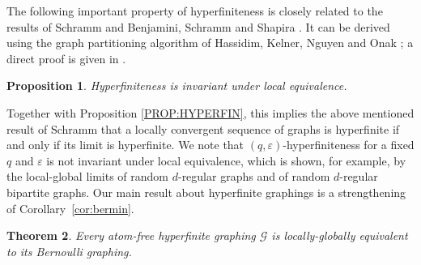 \documentclass{article}
\newtheorem{theorem}{Theorem}[section]
\newtheorem{proposition}[theorem]{Proposition}
\def\GG{\mathcal{G}}\def\HH{\mathcal{H}}\def\II{\mathcal{I}}
\def\eps{\varepsilon}
\begin{document}
The following important property of hyperfiniteness is closely
related to the results of Schramm \cite{Schramm} and Benjamini,
Schramm and Shapira \cite{BSS}. It can be derived using the graph
partitioning algorithm of Hassidim, Kelner, Nguyen and Onak
\cite{HKNO}; a direct proof is given in \cite{LL}.

\begin{proposition}\label{PROP:HF-WEAKISO}
Hyperfiniteness is invariant under local equivalence.
\end{proposition}

Together with Proposition \ref{PROP:HYPERFIN}, this implies the above
mentioned result of Schramm that  a  locally convergent sequence of
graphs is hyperfinite if and only if its limit is hyperfinite. We
note that $(q,\eps)$-hyperfiniteness for a fixed $q$ and $\eps$ is
not invariant under local equivalence, which is shown, for example,
by the local-global limits of random $d$-regular graphs and of random
$d$-regular bipartite graphs. Our main result about hyperfinite
graphings is a strengthening of Corollary~\ref{cor:bermin}.

\begin{theorem}\label{THM:HYP-BERN}
Every atom-free hyperfinite graphing $\GG$ is locally-globally
equivalent to its Bernoulli graphing.
\end{theorem}
\end{document}
